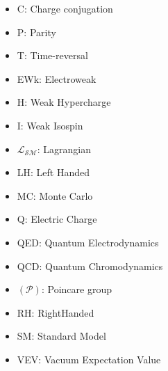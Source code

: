 \begin{itemize}
\item {C: Charge conjugation}
\item{P: Parity}
\item{T: Time-reversal}
\item{EWk: Electroweak}
\item{H: Weak Hypercharge}
\item{ I: Weak Isospin}
\item{$\mathcal{L_{SM}}$: Lagrangian}
\item{LH:  Left Handed}
\item{MC: Monte Carlo}
\item{Q: Electric Charge}
\item{QED: Quantum Electrodynamics}
\item{QCD: Quantum Chromodynamics}
\item{$(\mathcal{P})$: Poincare group}
\item{RH: RightHanded}
\item{SM: Standard Model}
\item{VEV: Vacuum Expectation Value}
\end{itemize}